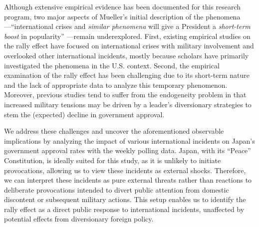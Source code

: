 \documentclass[letterpaper,12pt]{scrartcl}
\begin{document}
Although extensive empirical evidence has been documented for this research program, two major aspects of Mueller's initial description of the phenomena---``international crises and \textit{similar phenomena} will give a President a \textit{short-term boost} in popularity'' \citep[][p.~20; emphasis added by authors]{Mueller1970APSR}---remain underexplored. First, existing empirical studies on the rally effect have focused on international crises with military involvement and overlooked other international incidents, mostly because scholars have primarily investigated the phenomena in the U.S. context. Second, the empirical examination of the rally effect has been challenging due to its short-term nature and the lack of appropriate data to analyze this temporary phenomenon. Moreover, previous studies tend to suffer from the endogeneity problem in that increased military tensions may be driven by a leader's diversionary strategies to stem the (expected) decline in government approval.



We address these challenges and uncover the aforementioned observable implications by analyzing the impact of various international incidents on Japan's government approval rates with the weekly polling data. Japan, with its ``Peace'' Constitution, is ideally suited for this study, as it is unlikely to initiate provocations, allowing us to view these incidents as external shocks. Therefore, we can interpret these incidents as pure external threats rather than reactions to deliberate provocations intended to divert public attention from domestic discontent or subsequent military actions. This setup enables us to identify the rally effect as a direct public response to international incidents, unaffected by potential effects from diversionary foreign policy.
\end{document}
